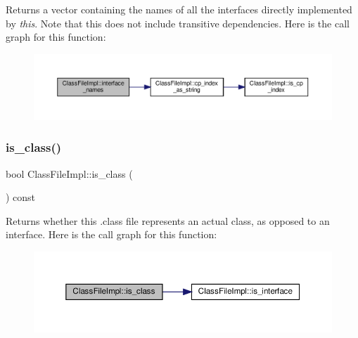 Returns a vector containing the names of all the interfaces directly implemented by {\itshape this}. Note that this does not include transitive dependencies. Here is the call graph for this function\+:\nopagebreak
\begin{figure}[H]
\begin{center}
\leavevmode
\includegraphics[width=350pt]{classClassFileImpl_ad2154cb52119b87cd74b722b69730dee_cgraph}
\end{center}
\end{figure}
\mbox{\label{classClassFileImpl_a3772a57b8eaadf252a9a9f36c063ab93}} 
\subsubsection{\texorpdfstring{is\+\_\+class()}{is\_class()}}
{\footnotesize\ttfamily bool Class\+File\+Impl\+::is\+\_\+class (\begin{DoxyParamCaption}{ }\end{DoxyParamCaption}) const}

Returns whether this .class file represents an actual class, as opposed to an interface. Here is the call graph for this function\+:\nopagebreak
\begin{figure}[H]
\begin{center}
\leavevmode
\includegraphics[width=350pt]{classClassFileImpl_a3772a57b8eaadf252a9a9f36c063ab93_cgraph}
\end{center}
\end{figure}
\mbox{\label{classClassFileImpl_a1f15226f5107cb036e81d480531cda08}} 
